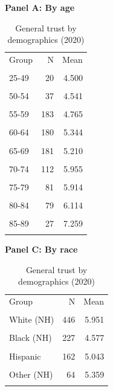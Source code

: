 \begin{table}[htbp]\centering\small
\caption{General trust by demographics (2020)}
\label{tab:trust_general_demographics_panels}
\begin{minipage}[t]{0.48\textwidth}\centering
\textbf{Panel A: By age}\\[0.3em]
\begin{tabular}{lrr}\toprule
Group & N & Mean \\\\ \midrule
25-49 & 20 & 4.500 \\\\
50-54 & 37 & 4.541 \\\\
55-59 & 183 & 4.765 \\\\
60-64 & 180 & 5.344 \\\\
65-69 & 181 & 5.210 \\\\
70-74 & 112 & 5.955 \\\\
75-79 & 81 & 5.914 \\\\
80-84 & 79 & 6.114 \\\\
85-89 & 27 & 7.259 \\\\
\bottomrule
\end{tabular}
\end{minipage}\hfill
\begin{minipage}[t]{0.48\textwidth}\centering
\textbf{Panel C: By race}\\[0.3em]
\begin{tabular}{lrr}\toprule
Group & N & Mean \\\\ \midrule
White (NH) & 446 & 5.951 \\\\
Black (NH) & 227 & 4.577 \\\\
Hispanic & 162 & 5.043 \\\\
Other (NH) & 64 & 5.359 \\\\
\bottomrule
\end{tabular}
\end{minipage}
\par\vspace{0.8em}
\begin{minipage}[t]{0.48\textwidth}\centering

\end{minipage}
\end{table}
